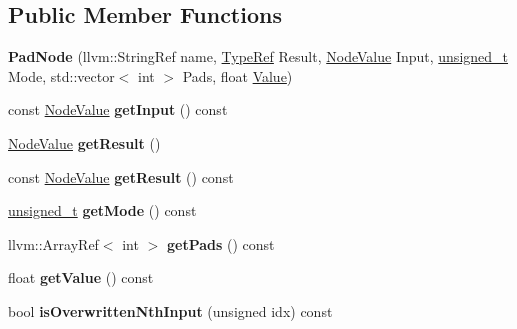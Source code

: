 \subsection*{Public Member Functions}
\begin{DoxyCompactItemize}
\item 
\mbox{\label{classglow_1_1_pad_node_ab0e8b6e10727c2c4e88c9b09104559bf}} 
{\bfseries Pad\+Node} (llvm\+::\+String\+Ref name, \hyperlink{structglow_1_1_type}{Type\+Ref} Result, \hyperlink{structglow_1_1_node_value}{Node\+Value} Input, \hyperlink{namespaceglow_a0ca574644e1e42ef193a9947fb4d8911}{unsigned\+\_\+t} Mode, std\+::vector$<$ int $>$ Pads, float \hyperlink{classglow_1_1_value}{Value})
\item 
\mbox{\label{classglow_1_1_pad_node_ad9da00169271d05810802915bd700d99}} 
const \hyperlink{structglow_1_1_node_value}{Node\+Value} {\bfseries get\+Input} () const
\item 
\mbox{\label{classglow_1_1_pad_node_a2f634b28c1786224df9cb977304b8ebc}} 
\hyperlink{structglow_1_1_node_value}{Node\+Value} {\bfseries get\+Result} ()
\item 
\mbox{\label{classglow_1_1_pad_node_a62b2ab2bc76f38f108f93c845e4ecae6}} 
const \hyperlink{structglow_1_1_node_value}{Node\+Value} {\bfseries get\+Result} () const
\item 
\mbox{\label{classglow_1_1_pad_node_a3a9edc28ff8df1f7fe2dd1434dcb6ea1}} 
\hyperlink{namespaceglow_a0ca574644e1e42ef193a9947fb4d8911}{unsigned\+\_\+t} {\bfseries get\+Mode} () const
\item 
\mbox{\label{classglow_1_1_pad_node_a9f0072c6fec0be920737f1e370d3ba53}} 
llvm\+::\+Array\+Ref$<$ int $>$ {\bfseries get\+Pads} () const
\item 
\mbox{\label{classglow_1_1_pad_node_af94d657082724f20935a47e73472b9cf}} 
float {\bfseries get\+Value} () const
\item 
\mbox{\label{classglow_1_1_pad_node_a6c28492ee073281383bf28c44a1f5b50}} 
bool {\bfseries is\+Overwritten\+Nth\+Input} (unsigned idx) const

\end{DoxyCompactItemize}
